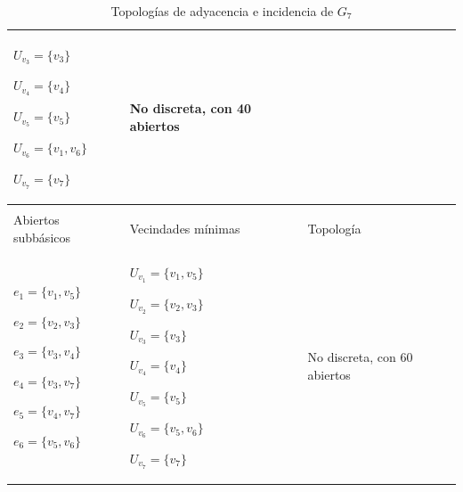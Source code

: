 \begin{table}[p]
\begin{tabular}{@{}>{\centering\arraybackslash}m{}>{\centering\arraybackslash}m{}>{\centering\arraybackslash}m{}@{}}
         ${U_{v_3}=\{v_3\}}$\par
         ${U_{v_4}=\{v_4\}}$\par
         ${U_{v_5}=\{v_5\}}$\par
         ${U_{v_6}=\{v_1,v_6\}}$\par
         ${U_{v_7}=\{v_7\}}$
      &
         No discreta, con 40 abiertos \\[6pt]
      \hline
      \multicolumn{3}{c}{\textbf{Topología de incidencia}} \\
      \hline
      Abiertos subbásicos & Vecindades mínimas & Topología \\
      \hline
         ${e_{1}=\{v_1,v_5\}}$\par
         ${e_{2}=\{v_2,v_3\}}$\par
         ${e_{3}=\{v_3,v_4\}}$\par
         ${e_{4}=\{v_3,v_7\}}$\par
         ${e_{5}=\{v_4,v_7\}}$\par
         ${e_{6}=\{v_5,v_6\}}$
      &
         ${U_{v_1}=\{v_1,v_5\}}$\par
         ${U_{v_2}=\{v_2,v_3\}}$\par
         ${U_{v_3}=\{v_3\}}$\par
         ${U_{v_4}=\{v_4\}}$\par
         ${U_{v_5}=\{v_5\}}$\par
         ${U_{v_6}=\{v_5,v_6\}}$\par
         ${U_{v_7}=\{v_7\}}$
      &
         No discreta, con 60 abiertos \\[6pt]
      \hline
   \end{tabular}
   \caption{Topologías de adyacencia e incidencia de $G_7$}
   \label{tab:topologias_G_7}
\end{table}
